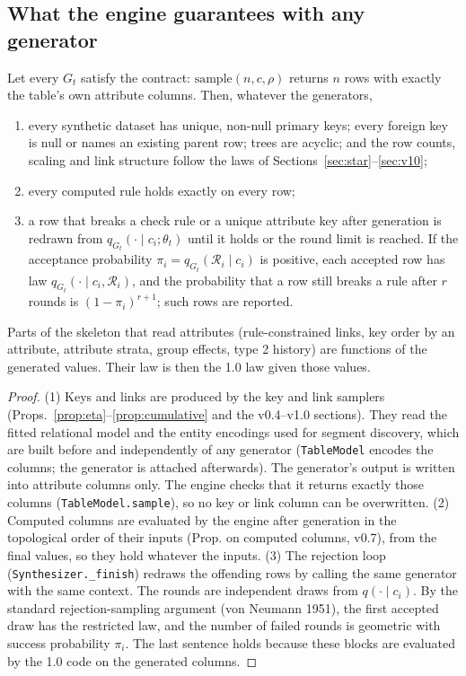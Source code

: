 \subsection{What the engine guarantees with any generator}
\begin{proposition}\label{prop:genskeleton}
Let every $G_t$ satisfy the contract: $\mathrm{sample}(n,c,\rho)$ returns $n$ rows with exactly the table's own
attribute columns. Then, whatever the generators,
\begin{enumerate}
\item every synthetic dataset has unique, non-null primary keys; every foreign key is null or names an existing
parent row; trees are acyclic; and the row counts, scaling and link structure follow the laws of
Sections~\ref{sec:star}--\ref{sec:v10};
\item every computed rule holds exactly on every row;
\item a row that breaks a check rule or a unique attribute key after generation is redrawn from
$q_{G_t}(\cdot\mid c_i;\theta_t)$ until it holds or the round limit is reached. If the acceptance probability
$\pi_i=q_{G_t}(\mathcal R_i\mid c_i)$ is positive, each accepted row has law $q_{G_t}(\cdot\mid c_i,\mathcal R_i)$,
and the probability that a row still breaks a rule after $r$ rounds is $(1-\pi_i)^{r+1}$; such rows are reported.
\end{enumerate}
Parts of the skeleton that read attributes (rule-constrained links, key order by an attribute, attribute strata,
group effects, type 2 history) are functions of the generated values. Their law is then the 1.0 law given those
values.
\end{proposition}
\begin{proof}
(1) Keys and links are produced by the key and link samplers (Props.~\ref{prop:eta}--\ref{prop:cumulative} and the
v0.4--v1.0 sections). They read the fitted relational model and the entity encodings used for segment discovery,
which are built before and independently of any generator (\texttt{TableModel} encodes the columns; the generator is
attached afterwards). The generator's output is written into attribute columns only. The engine checks that it
returns exactly those columns (\texttt{TableModel.sample}), so no key or link column can be overwritten. (2) Computed
columns are evaluated by the engine after generation in the topological order of their inputs (Prop. on computed
columns, v0.7), from the final values, so they hold whatever the inputs. (3) The rejection loop
(\texttt{Synthesizer.\_finish}) redraws the offending rows by calling the same generator with the same context. The
rounds are independent draws from $q(\cdot\mid c_i)$. By the standard rejection-sampling argument (von Neumann
1951), the first accepted draw has the restricted law, and the number of failed rounds is geometric with success
probability $\pi_i$. The last sentence holds because these blocks are evaluated by the 1.0 code on the generated
columns.
\end{proof}

